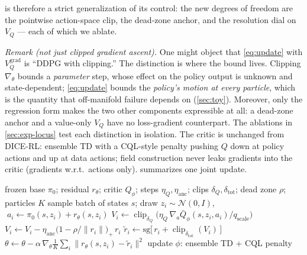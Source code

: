 \method{} is therefore a strict generalization of its control: the new
degrees of freedom are the pointwise action-space clip, the dead-zone
anchor, and the resolution dial on $V_Q$ --- each of which we ablate.

\emph{Remark (not just clipped gradient ascent).} One might object that
\cref{eq:update} with $V_Q^{\mathrm{grad}}$ is ``DDPG with clipping.''
The distinction is where the bound lives. Clipping $\nabla_\theta$ bounds a
\emph{parameter} step, whose effect on the policy output is unknown and
state-dependent; \cref{eq:update} bounds the \emph{policy's motion at every
particle}, which is the quantity that off-manifold failure depends on
(\cref{sec:toy}). Moreover, only the regression form makes the two other
components expressible at all: a dead-zone anchor and a value-only $V_Q$
have no loss-gradient counterpart. The ablations in
\cref{sec:exp-locus} test each distinction in isolation.
The critic is unchanged from DICE-RL: ensemble TD with a CQL-style
penalty pushing $Q$ down at policy actions and up at data actions;
field construction never leaks gradients into the critic
(gradients w.r.t.\ actions only).  summarizes one joint
update.

\begin{algorithm}[t]
\caption{\method{}: one update ($V_Q^{\mathrm{grad}}$ variant)}
\label{alg:cast}
\begin{algorithmic}[1]
\Require frozen base $\pi_0$; residual $r_\theta$; critic $Q_\phi$;
  steps $\eta_Q, \eta_{\mathrm{anc}}$; clips $\delta_Q, \delta_{\mathrm{tot}}$;
  dead zone $\rho$; particles $K$
\State sample batch of states $s$; draw $z_i \sim \mathcal{N}(0, I)$,
  $\;a_i \gets \pi_0(s, z_i) + r_\theta(s, z_i)$ 
\State $V_i \gets \operatorname{clip}_{\delta_Q}\!\big(\eta_Q\,
  \nabla_{a}\bar{Q}_\phi(s, z_i, a_i) / q_{\mathrm{scale}}\big)$
\State $V_i \gets V_i - \eta_{\mathrm{anc}}
  \big(1 - \rho / \lVert r_i \rVert\big)_{+}\, r_i$
\State $\tilde{r}_i \gets \mathrm{sg}\big[\, r_i +
  \operatorname{clip}_{\delta_{\mathrm{tot}}}(V_i) \,\big]$
\State $\theta \gets \theta - \alpha\, \nabla_\theta \tfrac{1}{K}
  \textstyle\sum_i \lVert r_\theta(s, z_i) - \tilde{r}_i \rVert^2$
\State update $\phi$: ensemble TD + CQL penalty 
\end{algorithmic}
\end{algorithm}

